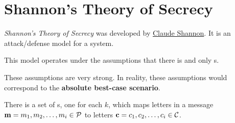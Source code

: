 \section{Shannon's Theory of Secrecy}\label{sec:Shannon_Theory_of_Secrecy}
\begin{definition}\label{def:Shannon_Theory_of_Secrecy}
  \emph{Shannon's Theory of Secrecy} was developed by \href{https://en.wikipedia.org/wiki/Claude_Shannon}{Claude Shannon}.
  It is an attack/defense model for a  system.

  This model operates under the assumptions that there is  and only s.

  \begin{remark}\label{rmk:Shannon_Theory_of_Secrecy_Assumption_Flaws}
    These assumptions are very strong.
    In reality, these assumptions would correspond to the \textbf{absolute best-case scenario}.
  \end{remark}

  There is a set of s, one for each $k$, which maps  letters in a message $\mathbf{m} = m_{1}, m_{2}, \ldots, m_{i} \in \operatorname{\mathcal{P}}$ to  letters $\mathbf{c} = c_{1}, c_{2}, \ldots, c_{i} \in \operatorname{\mathcal{C}}$.
\end{definition}

